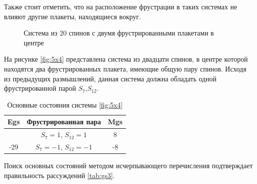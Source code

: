 \documentclass[utf8, babel, sor, jor, amsmath, amssymb, reprint]{elsarticle} %
\begin{document}
Также стоит отметить, что на расположение фрустрации в таких системах  не влияют другие плакеты, находящиеся вокруг.

\begin{figure}[H]
	\centering
	\caption{Система из 20 спинов с двумя фрустрированными плакетами в центре}
	\label{fig:5x4}
\end{figure}

На рисунке \eqref{fig:5x4} представлена система из двадцати спинов, в центре которой находятся два фрустрированных плакета, имеющие общую пару спинов. Исходя из предыдущих размышлений, данная система должна обладать одной фрустрированной парой  $S_7$,$S_12$.

\begin{table}[H]
	\centering
	\begin{tabular}{|c|c|c|}
		\hline
		Egs   &   Фрустрированная пара & Mgs\\
		\hline
		 &  $S_7=1$, $S_{12}=1$ & 8 \\
	\cline{2-3}
		-29	\multirow{3}{*}{}
		  &   $S_7=-1$, $S_{12}=-1$ & -8 \\
		\hline
	\end{tabular}
	\caption{Основные состояния системы \eqref{fig:5x4}}
	\label{tab:gs3}
\end{table}

Поиск основных состояний методом исчерпывающего перечисления подтверждает правильность рассуждений \eqref{tab:gs3}.
\end{document}
